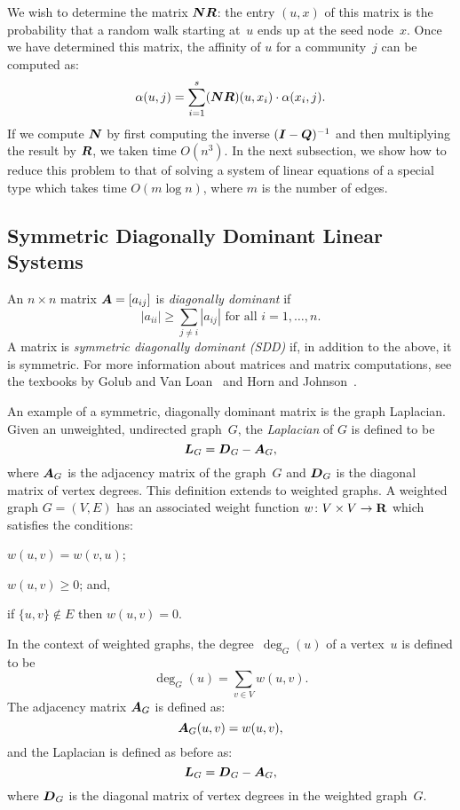 We wish to determine the matrix $\boldsymbol{N} \boldsymbol{R}$: the entry $(u, x)$ of this 
matrix is the probability that a random walk starting at~$u$ ends up at the seed 
node~$x$. Once we have determined this matrix, the affinity of $u$ for 
a community~$j$ can be computed as:
\begin{equation}\label{eqn:belonging_vector}
	\alpha (u, j) = \sum_{i = 1}^{s} (\boldsymbol{N} \boldsymbol{R}) (u, x_i) \cdot \alpha (x_i, j).
\end{equation}
If we compute $\boldsymbol{N}$ by first computing the inverse $(\boldsymbol{I} - \boldsymbol{Q})^{-1}$
and then multiplying the result by $\boldsymbol{R}$, we taken time $O(n^3)$. In the 
next subsection, we show how to reduce this problem to that of solving a 
system of linear equations of a special type which takes time $O(m \log n)$, where $m$
is the number of edges. 

\subsection{Symmetric Diagonally Dominant Linear Systems}

An $n \times n$ matrix $\boldsymbol{A} = [a_{ij}]$ is \emph{diagonally dominant} if 
\[
	|a_{ii}| \geq \sum_{j \neq i} {|a_{ij}|} \mbox{ for all } i = 1, \ldots, n.
\] 
A matrix is \emph{symmetric diagonally dominant (SDD)} if, in addition to the above, 
it is symmetric. For more information about matrices and matrix computations, 
see the texbooks by Golub and Van Loan~\cite{GvL13} and Horn and Johnson~\cite{HJ13}. 

An example of a symmetric, diagonally dominant matrix is the graph Laplacian. 
Given an unweighted, undirected graph~$G$, the \emph{Laplacian} of $G$ 
is defined to be 
\[
\boldsymbol{L}_G = \boldsymbol{D}_G - \boldsymbol{A}_G,
\] 
where $\boldsymbol{A}_G$ is the adjacency matrix of the graph~$G$ and $\boldsymbol{D}_G$ 
is the diagonal matrix of vertex degrees. This definition extends 
to weighted graphs. A weighted graph $G = (V, E)$ has an associated weight function 
$w \colon V \times V \to \mathbf{R}$ which satisfies the conditions: 
\begin{inparaenum}[(1)]
	\item $w(u, v) = w(v, u)$;  
	\item $w(u, v) \geq 0$; and, 
	\item if $\{u, v\} \notin E$ then $w(u, v) = 0$. 
\end{inparaenum}
In the context of weighted graphs, the degree~$\deg_G (u)$ of a vertex~$u$ is defined to be 
\[\label{eqn:weighted_degree}
	\deg_G (u) = \sum_{v \in V} w(u, v). 
\] 
The adjacency matrix $\boldsymbol{A}_{G}$ is defined as:
\[\label{eqn:weighted_adj_matrix}
	\boldsymbol{A}_{G}(u, v) = w(u, v),
\]
and the Laplacian is defined as before as: 
\[\label{eqn:weighted_laplacian}
	\boldsymbol{L}_G = \boldsymbol{D}_G - \boldsymbol{A}_G,
\]
where $\boldsymbol{D}_G$ is the diagonal matrix of vertex degrees in the weighted graph~$G$.

